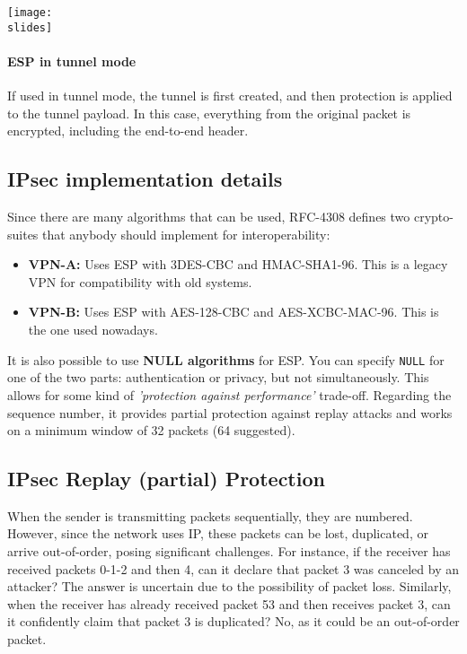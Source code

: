 \vspace*{5mm}
\noindent
\begin{minipage}{0.5\textwidth}
    \centering
    \texttt{[image: \\slides]}
\end{minipage}
\hspace{0.05\textwidth}
\begin{minipage}{0.4\textwidth}
    \paragraph{ESP in tunnel mode}
    If used in tunnel mode, the tunnel is first created, and then protection is applied to the tunnel payload. In this case, everything from the original packet is encrypted, including the end-to-end header.
\end{minipage}



\subsection{IPsec implementation details}

Since there are many algorithms that can be used, RFC-4308 defines two crypto-suites that anybody should implement for interoperability:

\begin{itemize}
    \item \textbf{VPN-A:} Uses ESP with 3DES-CBC and HMAC-SHA1-96. This is a legacy VPN for compatibility with old systems.
    \item \textbf{VPN-B:} Uses ESP with AES-128-CBC and AES-XCBC-MAC-96. This is the one used nowadays.
\end{itemize}

It is also possible to use \textbf{NULL algorithms} for ESP. You can specify \texttt{NULL} for one of the two parts: authentication or privacy, but not simultaneously. This allows for some kind of \textit{'protection against performance'} trade-off. Regarding the sequence number, it provides partial protection against replay attacks and works on a minimum window of 32 packets (64 suggested).


\subsection{IPsec Replay (partial) Protection}

When the sender is transmitting packets sequentially, they are numbered. However, since the network uses IP, these packets can be lost, duplicated, or arrive out-of-order, posing significant challenges. For instance, if the receiver has received packets 0-1-2 and then 4, can it declare that packet 3 was canceled by an attacker? The answer is uncertain due to the possibility of packet loss. Similarly, when the receiver has already received packet 53 and then receives packet 3, can it confidently claim that packet 3 is duplicated? No, as it could be an out-of-order packet.

